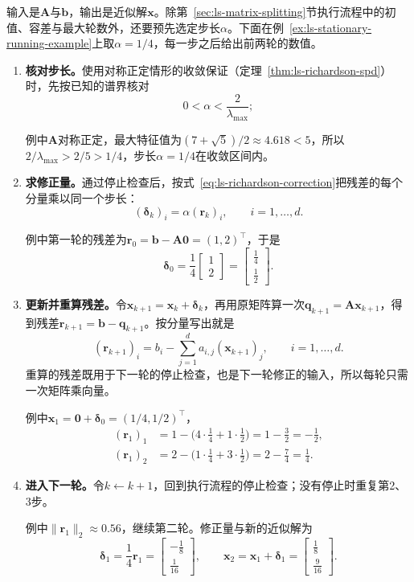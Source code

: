 输入是$\bm A$与$\bm b$，输出是近似解$\bm x$。除第~\ref{sec:ls-matrix-splitting}节执行流程中的初值、容差与最大轮数外，还要预先选定步长$\alpha$。下面在例~\ref{ex:ls-stationary-running-example}上取$\alpha=1/4$，每一步之后给出前两轮的数值。
\begin{enumerate}
 \item \textbf{核对步长。}使用对称正定情形的收敛保证（定理~\ref{thm:ls-richardson-spd}）时，先按已知的谱界核对
 \begin{equation}
  0<\alpha<\frac{2}{\lambda_{\max}} ;
  \label{eq:ls-richardson-step-range}
 \end{equation}
 
 例中$\bm A$对称正定，最大特征值为$(7+\sqrt5)/2\approx4.618<5$，所以$2/\lambda_{\max}>2/5>1/4$，步长$\alpha=1/4$在收敛区间内。

 \item \textbf{求修正量。}通过停止检查后，按式~\eqref{eq:ls-richardson-correction}把残差的每个分量乘以同一个步长：
 \[
  (\bm\delta_k)_i=\alpha(\bm r_k)_i,\qquad i=1,\ldots,d .
 \]

 例中第一轮的残差为$\bm r_0=\bm b-\bm A\bm 0=(1,2)^\top$，于是
 \[
  \bm\delta_0=\frac14\begin{bmatrix}1\\2\end{bmatrix}=\begin{bmatrix}\tfrac14\\\tfrac12\end{bmatrix}.
 \]

 \item \textbf{更新并重算残差。}令$\bm x_{k+1}=\bm x_k+\bm\delta_k$，再用原矩阵算一次$\bm q_{k+1}=\bm A\bm x_{k+1}$，得到残差$\bm r_{k+1}=\bm b-\bm q_{k+1}$。按分量写出就是
 \begin{equation}
  (\bm r_{k+1})_i=b_i-\sum_{j=1}^d a_{i,j}(\bm x_{k+1})_j ,\qquad i=1,\ldots,d .
  \label{eq:ls-stationary-residual-update}
 \end{equation}
 重算的残差既用于下一轮的停止检查，也是下一轮修正的输入，所以每轮只需一次矩阵乘向量。

 例中$\bm x_1=\bm 0+\bm\delta_0=(1/4,1/2)^\top$，
 \[
  \begin{aligned}
  (\bm r_1)_1&=1-\bigl(4\cdot\tfrac14+1\cdot\tfrac12\bigr)=1-\tfrac32=-\tfrac12,\\
  (\bm r_1)_2&=2-\bigl(1\cdot\tfrac14+3\cdot\tfrac12\bigr)=2-\tfrac74=\tfrac14 .
  \end{aligned}
 \]

 \item \textbf{进入下一轮。}令$k\leftarrow k+1$，回到执行流程的停止检查；没有停止时重复第2、3步。

 例中$\lVert\bm r_1\rVert_2\approx0.56$，继续第二轮。修正量与新的近似解为
 \[
  \bm\delta_1=\frac14\bm r_1=\begin{bmatrix}-\tfrac18\\\tfrac1{16}\end{bmatrix},\qquad
  \bm x_2=\bm x_1+\bm\delta_1=\begin{bmatrix}\tfrac18\\\tfrac9{16}\end{bmatrix}.
 \]

\end{enumerate}

